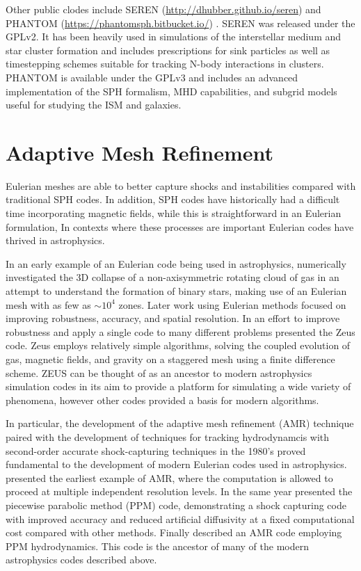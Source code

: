 \documentclass[11pt,twoside]{article}
\begin{document}
Other public clodes include SEREN ({\small \url{http://dhubber.github.io/seren}}) \citep{hubber2011} and PHANTOM ({\small \url{https://phantomsph.bitbucket.io/}}) \citep{price2017}. SEREN was released under the GPLv2. It has been heavily used in simulations of the interstellar medium and star cluster formation and includes prescriptions for sink particles \citep{walch2013} as well as timestepping schemes suitable for tracking N-body interactions in clusters. PHANTOM is available under the GPLv3 and includes an advanced implementation of the SPH formalism, MHD capabilities, and subgrid models useful for studying the ISM and galaxies.

\section{Adaptive Mesh Refinement}
\label{amr}

Eulerian meshes are able to better capture shocks and instabilities compared with traditional SPH codes. In addition, SPH codes have historically had a difficult time incorporating magnetic fields, while this is straightforward in an Eulerian formulation, In contexts where these processes are important Eulerian codes have thrived in astrophysics.

In an early example of an Eulerian code being used in astrophysics, \citet{boss1979} numerically investigated the 3D collapse of a non-axisymmetric rotating cloud of gas in an attempt to understand the formation of binary stars, making use of an Eulerian mesh with as few as $\sim 10^4$ zones. Later work using Eulerian methods focused on improving robustness, accuracy, and spatial resolution. In an effort to improve robustness and apply a single code to many different problems \citet{stone1992} presented the Zeus code. Zeus employs relatively simple algorithms, solving the coupled evolution of gas, magnetic fields, and gravity on a staggered mesh using a finite difference scheme. ZEUS can be thought of as an ancestor to modern astrophysics simulation codes in its aim to provide a platform for simulating a wide variety of phenomena, however other codes provided a basis for modern algorithms.

In particular, the development of the adaptive mesh refinement (AMR) technique paired with the development of techniques for tracking hydrodynamcis with second-order accurate shock-capturing techniques in the 1980's proved fundamental to the development of modern Eulerian codes used in astrophysics. \citet{berger1984} presented the earliest example of AMR, where the computation is allowed to proceed at multiple independent resolution levels. In the same year \citet{colella1984} presented the piecewise parabolic method (PPM) code, demonstrating a shock capturing code with improved accuracy and reduced artificial diffusivity at a fixed computational cost compared with other methods. Finally \citet{berger1989} described an AMR code employing PPM hydrodynamics. This code is the ancestor of many of the modern astrophysics codes described above.
\end{document}
